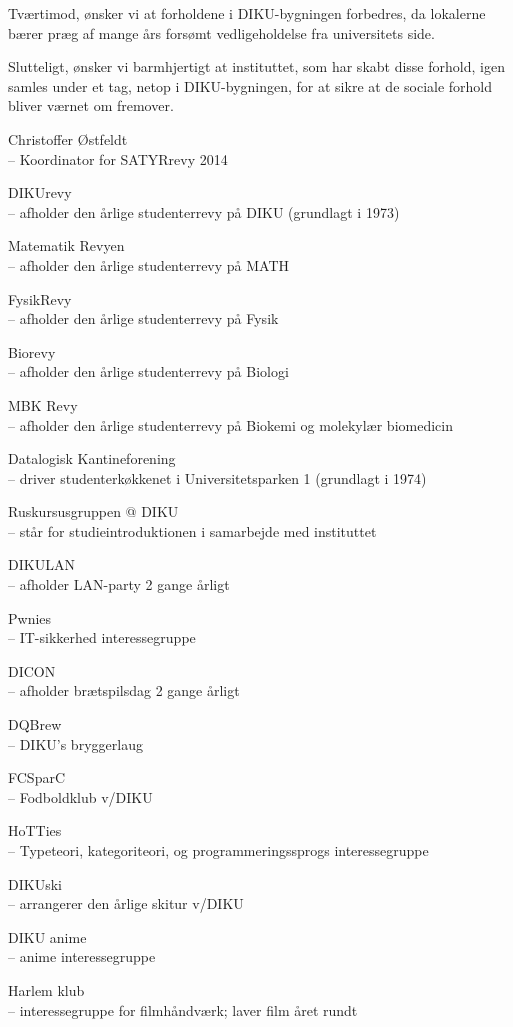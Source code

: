 \documentclass[a4paper]{article}
\begin{document}
Tværtimod, ønsker vi at forholdene i DIKU-bygningen forbedres, da
lokalerne bærer præg af mange års forsømt vedligeholdelse fra
universitets side.

Slutteligt, ønsker vi barmhjertigt at instituttet, som har skabt disse
forhold, igen samles under et tag, netop i DIKU-bygningen, for at
sikre at de sociale forhold bliver værnet om fremover.

\begin{flushright}

\footnotesize\sffamily\itshape

Christoffer Østfeldt \\
-- Koordinator for SATYRrevy 2014

DIKUrevy \\
-- afholder den årlige studenterrevy på DIKU (grundlagt i 1973)

Matematik Revyen \\
-- afholder den årlige studenterrevy på MATH

FysikRevy \\
-- afholder den årlige studenterrevy på Fysik

Biorevy \\
-- afholder den årlige studenterrevy på Biologi

MBK Revy \\
-- afholder den årlige studenterrevy på Biokemi og molekylær biomedicin

Datalogisk Kantineforening \\
-- driver studenterkøkkenet i Universitetsparken 1 (grundlagt i 1974)

Ruskursusgruppen @ DIKU \\
-- står for studieintroduktionen i samarbejde med instituttet

DIKULAN \\
-- afholder LAN-party 2 gange årligt

Pwnies \\
-- IT-sikkerhed interessegruppe

DICON \\
-- afholder brætspilsdag 2 gange årligt

DQBrew \\
-- DIKU's bryggerlaug

FCSparC \\
-- Fodboldklub v/DIKU

HoTTies \\
-- Typeteori, kategoriteori, og programmeringssprogs interessegruppe

DIKUski \\
-- arrangerer den årlige skitur v/DIKU

DIKU anime \\
-- anime interessegruppe

Harlem klub \\
-- interessegruppe for filmhåndværk;  laver film året rundt

\end{flushright}
\end{document}

